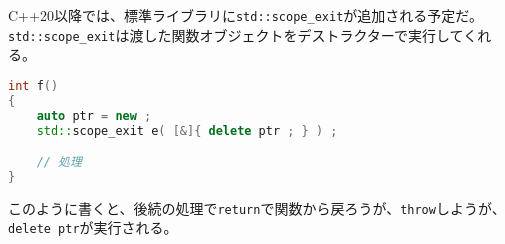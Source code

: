 C++20以降では、標準ライブラリに\texttt{std::scope\_exit}が追加される予定だ。\texttt{std::scope\_exit}は渡した関数オブジェクトをデストラクターで実行してくれる。

\begin{lstlisting}[language={C++}]
int f()
{
    auto ptr = new ;
    std::scope_exit e( [&]{ delete ptr ; } ) ;

    // 処理
}
\end{lstlisting}

このように書くと、後続の処理で\texttt{return}で関数から戻ろうが、\texttt{throw}しようが、\texttt{delete ptr}が実行される。
